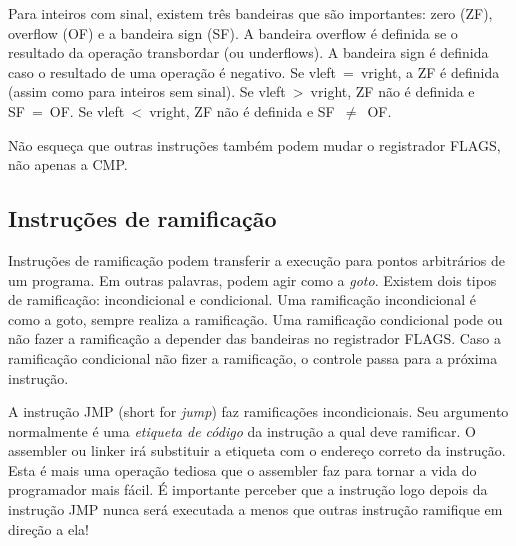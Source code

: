 Para inteiros com sinal, existem três bandeiras
que são importantes: zero  (ZF),
overflow (OF) e a bandeira sign
 (SF). A bandeira overflow é definida se o resultado da operação
transbordar (ou underflows). A bandeira sign é definida caso o resultado de uma
operação é negativo. Se {\code vleft~=~vright}, a ZF é definida (assim
como para inteiros sem sinal). Se {\code vleft~>~vright}, ZF não é definida e
SF~=~OF.  Se {\code vleft~<~vright}, ZF não é definida e SF~$\neq$~OF.

Não esqueça que outras instruções também podem mudar o registrador FLAGS, 
não apenas a {\code CMP}.

\subsection{Instruções de ramificação}

Instruções de ramificação podem transferir a execução para pontos arbitrários de um programa.
Em outras palavras, podem agir como a \emph{goto}. Existem dois tipos de ramificação:
incondicional e condicional. Uma ramificação incondicional é como a goto,
sempre realiza a ramificação. Uma ramificação condicional pode ou não fazer a
ramificação a depender das bandeiras no registrador FLAGS. Caso a ramificação condicional 
não fizer a ramificação, o controle passa para a próxima instrução.

A instrução {\code JMP} (short for \emph{jump}) faz
ramificações incondicionais. Seu argumento normalmente é uma \emph{etiqueta
de código} da instrução a qual deve ramificar. O assembler ou linker irá
substituir a etiqueta com o endereço correto da instrução. Esta é mais uma
operação tediosa que o assembler faz para tornar a
vida do programador mais fácil. É importante perceber que a instrução
logo depois da instrução {\code JMP} nunca será executada
a menos que outras instrução ramifique em direção a ela!

